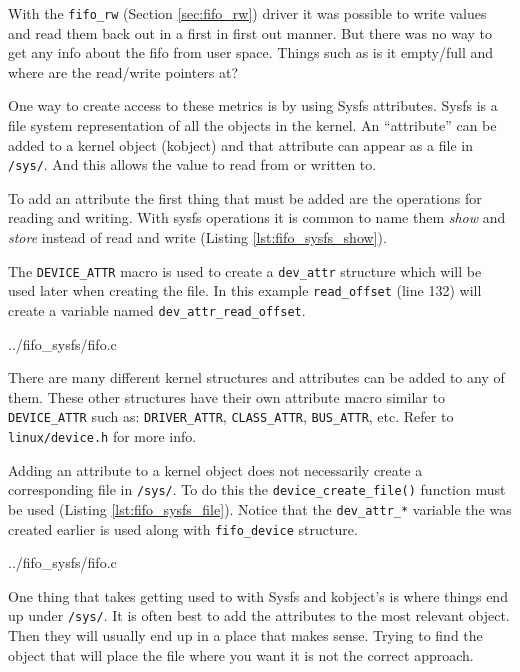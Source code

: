 \documentclass{article}
\begin{document}
With the \verb+fifo_rw+ (Section \ref{sec:fifo_rw}) driver it was possible
to write values and read them back out in a first in first out manner.
But there was no way to get any info about the fifo from user space.
Things such as is it empty/full and where are the read/write pointers
at?

One way to create access to these metrics is by using Sysfs attributes.
Sysfs is a file system representation of all the objects in the kernel.
An ``attribute'' can be added to a kernel object (kobject) and
that attribute can appear as a file in \verb+/sys/+.
And this allows the value to read from or written to.

To add an attribute the first thing that must be added are the operations
for reading and writing.
With sysfs operations it is common to name them \emph{show} and \emph{store}
instead of read and write (Listing \ref{lst:fifo_sysfs_show}).

The \verb+DEVICE_ATTR+ macro is used to create a \verb+dev_attr+ structure
which will be used later when creating the file.
In this example \verb+read_offset+ (line 132) will create a variable named
\verb+dev_attr_read_offset+.


	{../fifo_sysfs/fifo.c}

There are many different kernel structures and attributes can be
added to any of them.
These other structures have their own attribute macro similar to
\verb+DEVICE_ATTR+ such as: \verb+DRIVER_ATTR+, \verb+CLASS_ATTR+,
\verb+BUS_ATTR+, etc.
Refer to \verb+linux/device.h+ for more info.

Adding an attribute to a kernel object does not necessarily create
a corresponding file in \verb+/sys/+.
To do this the \verb+device_create_file()+ function must be used
(Listing \ref{lst:fifo_sysfs_file}).
Notice that the \verb+dev_attr_*+ variable the was created earlier
is used along with \verb+fifo_device+ structure.


	{../fifo_sysfs/fifo.c}

One thing that takes getting used to with Sysfs and kobject's is where
things end up under \verb+/sys/+.
It is often best to add the attributes to the most relevant object.
Then they will usually end up in a place that makes sense.
Trying to find the object that will place the file where you want it
is not the correct approach.
\end{document}
